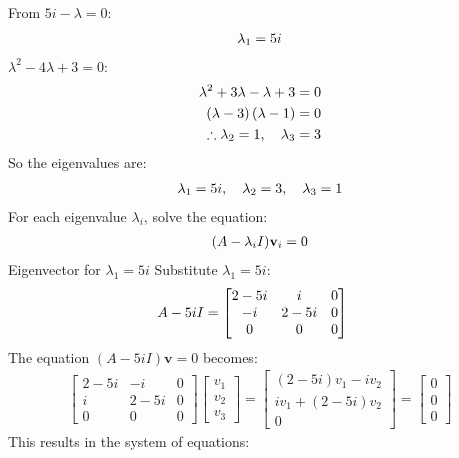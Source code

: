 \begin{enumerate}
From $5i - \lambda = 0$:
\begin{align}
    \lambda_1 = 5i\notag
\end{align}
$\lambda^2 - 4\lambda + 3 = 0$:
\begin{align}
    \lambda^2+3\lambda-\lambda+3&=0\notag\\
    \left(\lambda-3\right)\left(\lambda-1\right)&=0\notag\\
    \therefore\lambda_2=1,\quad\lambda_3&=3
\end{align}
So the eigenvalues are:
\begin{align}
    \lambda_1 = 5i, \quad \lambda_2 = 3, \quad \lambda_3 = 1\notag
\end{align}
For each eigenvalue $\lambda_i$, solve the equation:
\begin{align}
    (A - \lambda_i I)\mathbf{v}_i = 0\notag
\end{align}
Eigenvector for $\lambda_1 = 5i$
Substitute $\lambda_1 = 5i$:
\begin{align}
    A - 5iI &= \begin{bmatrix}
    2 - 5i & i & 0 \\
    -i & 2 - 5i & 0 \\
    0 & 0 & 0
    \end{bmatrix}\notag
\end{align}
The equation $\displaystyle (A - 5iI)\mathbf{v}=0$ becomes:
\begin{align*}
    \begin{bmatrix}
        2 - 5i & -i & 0 \\
        i & 2 - 5i & 0 \\
        0 & 0 & 0
    \end{bmatrix} \begin{bmatrix}
        v_1 \\
        v_2 \\
        v_3
    \end{bmatrix} = \begin{bmatrix}
        (2 - 5i)v_1 - iv_2 \\
        iv_1 + (2 - 5i)v_2 \\
        0
    \end{bmatrix} = \begin{bmatrix}
        0 \\
        0 \\
        0
    \end{bmatrix}
\end{align*}
This results in the system of equations:
\begin{align*}

\end{align*}
\end{enumerate}
